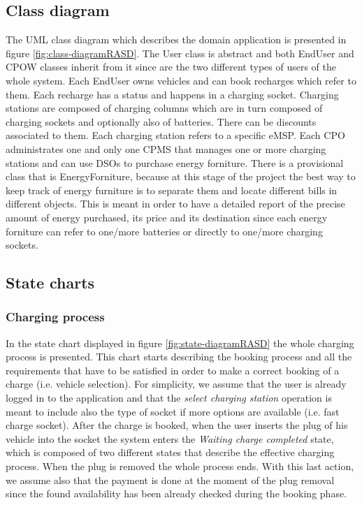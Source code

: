 \documentclass[a4paper]{report}
\begin{document}
\subsection{Class diagram}
The UML class diagram which describes the domain application is presented in figure \ref{fig:class-diagramRASD}. The User class is abstract and both EndUser and CPOW classes inherit from it since are the two different types of users of the whole system. Each EndUser owns vehicles and can book recharges which refer to them. Each recharge has a status and happens in a charging socket. Charging stations are composed of charging columns which are in turn composed of charging sockets and optionally also of batteries. There can be discounts associated to them. Each charging station refers to a specific eMSP. Each CPO administrates one and only one CPMS that manages one or more charging stations and can use DSOs to purchase energy forniture. There is a provisional class that is EnergyForniture, because at this stage of the project the best way to keep track of energy furniture is to separate them and locate different bills in different objects. This is meant in order to have a detailed report of the precise amount of energy purchased, its price and its destination since each energy forniture can refer to one/more batteries or directly to one/more charging sockets.

\subsection{State charts}
\subsubsection{Charging process}
In the state chart displayed in figure \ref{fig:state-diagramRASD} the whole charging process is presented. This chart starts describing the booking process and all the requirements that have to be satisfied in order to make a correct booking of a charge (i.e. vehicle selection).  For simplicity, we assume that the user is already logged in to the application and that the \textit{select charging station} operation is meant to include also the type of socket if more options are available (i.e. fast charge socket). After the charge is booked, when the user inserts the plug of his vehicle into the socket the system enters the \textit{Waiting charge completed} state, which is composed of two different states that describe the effective charging process. When the plug is removed the whole process ends. With this last action, we assume also that the payment is done at the moment of the plug removal since the found availability has been already checked during the booking phase.
\end{document}
